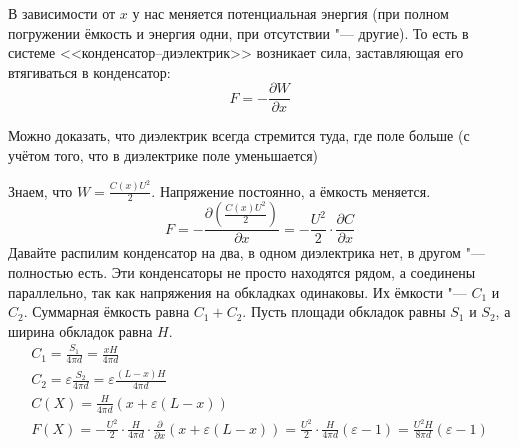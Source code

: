     В зависимости от $x$ у нас меняется потенциальная энергия (при полном погружении ёмкость и энергия одни,
    при отсутствии "--- другие).
    То есть в системе <<конденсатор--диэлектрик>> возникает сила, заставляющая его втягиваться в конденсатор:
    \[ F = - \frac{\partial W}{\partial x} \]
    \begin{Rem}
      Можно доказать, что диэлектрик всегда стремится туда, где поле больше
      (с учётом того, что в диэлектрике поле уменьшается)
    \end{Rem}

    Знаем, что $W = \frac{C(x)U^2}{2}$.
    Напряжение постоянно, а ёмкость меняется.
    \[F = -\frac{\partial\left(\frac{C(x)U^2}{2}\right)}{\partial x} = -\frac{U^2}{2} \cdot \frac{\partial C}{\partial x}\]
    Давайте распилим конденсатор на два, в одном диэлектрика нет, в другом "--- полностью есть.
    Эти конденсаторы не просто находятся рядом, а соединены параллельно, так как напряжения на обкладках одинаковы.
    Их ёмкости "--- $C_1$ и $C_2$.
    Суммарная ёмкость равна $C_1+C_2$.
    Пусть площади обкладок равны $S_1$ и $S_2$, а ширина обкладок равна $H$.
    \begin{gather*}
    C_1=\frac{S_1}{4\pi d} = \frac{xH}{4\pi d} \\
    C_2=\varepsilon\frac{S_2}{4\pi d} = \varepsilon\frac{(L-x)H}{4\pi d} \\
    C(X) = \frac{H}{4\pi d}(x+\varepsilon(L-x)) \\
    F(X) = -\frac{U^2}{2} \cdot \frac{H}{4\pi d} \cdot \frac{\partial}{\partial x}(x + \varepsilon(L-x))
         = \frac{U^2}{2} \cdot \frac{H}{4\pi d}(\varepsilon-1)
         = \frac{U^2H}{8\pi d} (\varepsilon-1)
    \end{gather*}
